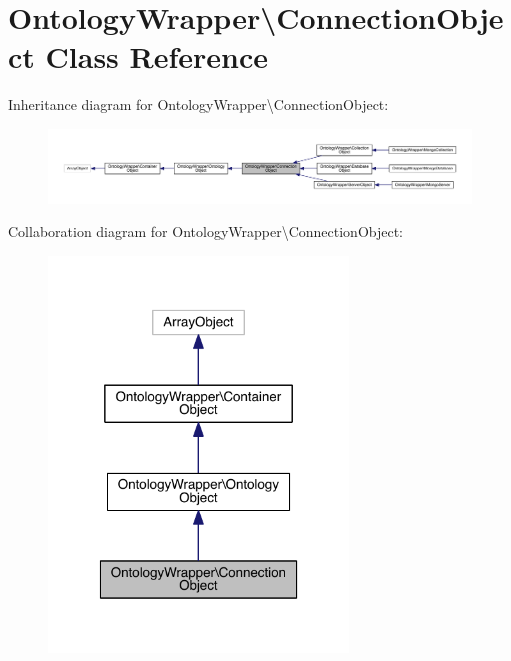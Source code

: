 \hypertarget{class_ontology_wrapper_1_1_connection_object}{\section{Ontology\-Wrapper\textbackslash{}Connection\-Object Class Reference}
\label{class_ontology_wrapper_1_1_connection_object}
}


Inheritance diagram for Ontology\-Wrapper\textbackslash{}Connection\-Object\-:
\nopagebreak
\begin{figure}[H]
\begin{center}
\leavevmode
\includegraphics[width=350pt]{class_ontology_wrapper_1_1_connection_object__inherit__graph}
\end{center}
\end{figure}


Collaboration diagram for Ontology\-Wrapper\textbackslash{}Connection\-Object\-:
\nopagebreak
\begin{figure}[H]
\begin{center}
\leavevmode
\includegraphics[width=226pt]{class_ontology_wrapper_1_1_connection_object__coll__graph}
\end{center}
\end{figure}
